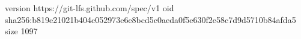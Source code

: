 version https://git-lfs.github.com/spec/v1
oid sha256:b819e21021b404c052973e6e8bcd5c0aeda0f5e630f2e58c7d9d5710b84afda5
size 1097
